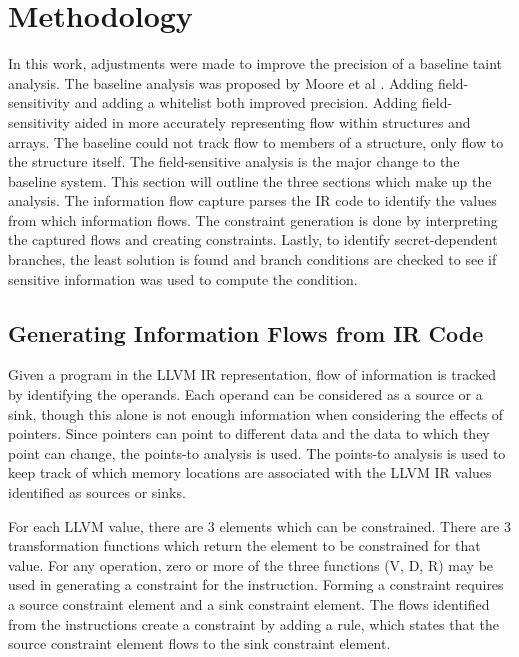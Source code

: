 \section{Methodology}
In this work, adjustments were made to improve the precision of a baseline
taint analysis. The baseline analysis was proposed by Moore et al
\cite{moore2011static}. Adding field-sensitivity and adding a whitelist both
improved precision. Adding field-sensitivity aided in more
accurately representing flow within structures and arrays. The baseline could
not track flow to members of a structure, only flow to the structure itself. The
field-sensitive analysis is the major change to the baseline system. This
section will outline the three sections which make up the analysis. The
information flow capture parses the IR code to identify the values from which
information flows. The constraint generation is done by interpreting the
captured flows and creating constraints. Lastly, to identify secret-dependent
branches, the least solution is found and branch conditions are checked to see if
sensitive information was used to compute the condition.

\subsection{Generating Information Flows from IR Code}

   Given a program in the LLVM IR representation, flow of information is tracked
   by identifying the operands. Each operand can be considered as a source or a
   sink, though this alone is not enough information when considering the
   effects of pointers. Since pointers can point to different data and the data
   to which they point can change, the points-to analysis is used. The
   points-to analysis is used to keep track of which memory locations are
   associated with the LLVM IR values identified as sources or sinks.

   For each LLVM value, there are 3 elements which can be constrained. There are
   3 transformation functions which return the element to be constrained for
   that value. For any operation, zero or more of the three functions (V, D, R)
   may be used in generating a constraint for the instruction. Forming a
   constraint requires a source constraint element and a sink constraint
   element. The flows identified from the instructions create a constraint by
   adding a rule, which states that the source constraint element flows to the sink
   constraint element.

